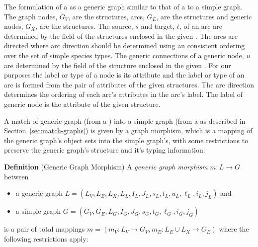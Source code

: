 \documentclass{cekarticle}
\begin{document}
The formulation of a  as a generic graph similar to that
of a  to a simple graph.
The graph nodes, $G_{V}$, are the  structures,
arcs, $G_{E}$, are the  structures and generic nodes, $G_{X}$, are the
 structures.  The source, $s$ and target, $t$, of an arc are determined by the
 field of the  structures enclosed in the given
.  The arcs are directed
where arc direction should be determined using an consistent ordering over the set of simple species
types.
The generic connections of a generic node, $u$ are determined by the  field
of the  structure enclosed in the given . 
For our purposes the label or type of a node is its
 attribute and the label or type of an arc is formed from the pair of
 attributes of the given  structures.
The arc direction determines the ordering of each arc's 
attributes in the arc's label.
The label of generic node is the  attribute of the given
 structure.

A match of generic graph (from a ) into a simple graph
(from a  as described in Section~\ref{sec:match-graphs}) is given by a graph
morphism, which is a mapping of the generic graph's object
sets into the simple graph's, with some restrictions to preserve the generic graph's structure and
it's typing information:

\textbf{Definition} (Generic Graph Morphism) A \emph{generic graph morphism}
$m : L \rightarrow G$ between
\begin{itemize}
\item a generic graph
$L = (L_{V}, L_{E}, L_{X}, L_{L}, I_{L}, J_{L}, s_{L}, t_{L}, u_{L}, \ell_{L}, i_{L}, j_{L})$ and
\item a simple graph $G = (G_{V}, G_{E}, L_{G}, I_{G}, J_{G}, s_{G}, t_{G}, \ell_{G}, i_{G}, j_{G})$
\end{itemize}
is a pair of total mappings
$m = (m_{V} : L_{V} \rightarrow G_{V}, m_{E} : L_{E} \cup L_{X} \rightarrow G_{E})$
where the following restrictions apply:
\end{document}
